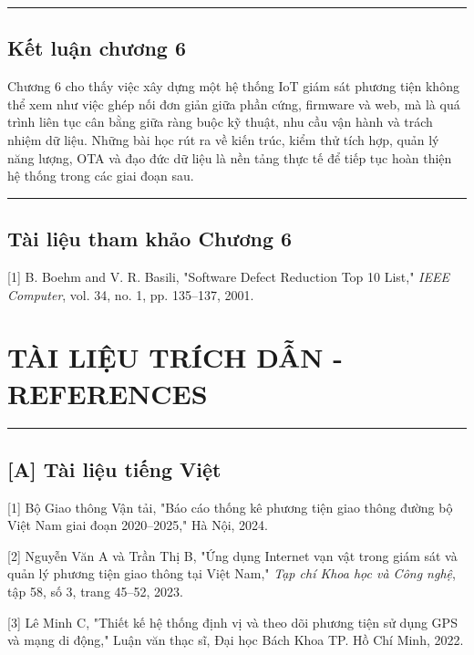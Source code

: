 \documentclass[13pt,a4paper]{extarticle}
\renewcommand{\\}{\thesislongtableorignewline\hline}%
\newcommand{\majorheading}[1]{\clearpage\section*{#1}}
\begin{document}
\begin{center}\rule{0.5\linewidth}{0.5pt}\end{center}

\subsection{Kết luận chương
6}\label{kux1ebft-luux1eadn-chux1b0ux1a1ng-6}

Chương 6 cho thấy việc xây dựng một hệ thống IoT giám sát phương tiện
không thể xem như việc ghép nối đơn giản giữa phần cứng, firmware và
web, mà là quá trình liên tục cân bằng giữa ràng buộc kỹ thuật, nhu cầu
vận hành và trách nhiệm dữ liệu. Những bài học rút ra về kiến trúc, kiểm
thử tích hợp, quản lý năng lượng, OTA và đạo đức dữ liệu là nền tảng
thực tế để tiếp tục hoàn thiện hệ thống trong các giai đoạn sau.

\begin{center}\rule{0.5\linewidth}{0.5pt}\end{center}

\subsection{Tài liệu tham khảo Chương
6}\label{tuxe0i-liux1ec7u-tham-khux1ea3o-chux1b0ux1a1ng-6}

{[}1{]} B. Boehm and V. R. Basili, "Software Defect Reduction Top 10
List," \emph{IEEE Computer}, vol. 34, no. 1, pp. 135--137, 2001.

\majorheading{TÀI LIỆU TRÍCH DẪN - REFERENCES}

\begin{center}\rule{0.5\linewidth}{0.5pt}\end{center}

\subsection{{[}A{]} Tài liệu tiếng
Việt}\label{a-tuxe0i-liux1ec7u-tiux1ebfng-viux1ec7t}

{[}1{]} Bộ Giao thông Vận tải, "Báo cáo thống kê phương tiện giao thông
đường bộ Việt Nam giai đoạn 2020--2025," Hà Nội, 2024.

{[}2{]} Nguyễn Văn A và Trần Thị B, "Ứng dụng Internet vạn vật trong
giám sát và quản lý phương tiện giao thông tại Việt Nam," \emph{Tạp chí
Khoa học và Công nghệ}, tập 58, số 3, trang 45--52, 2023.

{[}3{]} Lê Minh C, "Thiết kế hệ thống định vị và theo dõi phương tiện sử
dụng GPS và mạng di động," Luận văn thạc sĩ, Đại học Bách Khoa TP. Hồ
Chí Minh, 2022.
\end{document}
